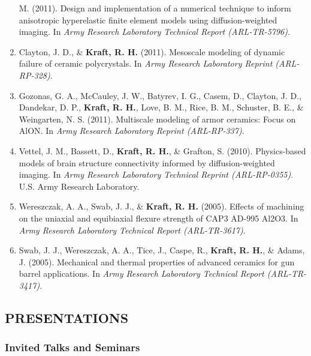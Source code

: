 \documentclass[11pt]{article}
\begin{document}
\begin{enumerate}
M. 
(2011). 
Design and implementation of a
  numerical technique to inform anisotropic hyperelastic finite element
  models using diffusion-weighted imaging. 
In \emph{Army Research
  Laboratory Technical Report (ARL-TR-5796)}.
\item
  Clayton, J. 
D., \& \textbf{\textbf{Kraft,} R. 
H.} (2011). 
Mesoscale modeling of dynamic
  failure of ceramic polycrystals. 
In \emph{Army Research Laboratory
  Reprint (ARL-RP-328)}.
\item
  Gozonas, G. 
A., McCauley, J. 
W., Batyrev, I. 
G., Casem, D., Clayton,
  J. 
D., Dandekar, D. 
P., \textbf{\textbf{Kraft,} R. 
H.}, Love, B. 
M., Rice, B. 
M.,
  Schuster, B. 
E., \& Weingarten, N. 
S. 
(2011). 
Multiscale modeling of
  armor ceramics: Focus on AlON. 
In \emph{Army Research Laboratory
  Reprint (ARL-RP-337)}.
\item
  Vettel, J. 
M., Bassett, D., \textbf{\textbf{Kraft,} R. 
H.}, \& Grafton, S. 
(2010).
  Physics-based models of brain structure connectivity informed by
  diffusion-weighted imaging. 
In \emph{Army Research Laboratory
  Technical Reprint (ARL-RP-0355)}. 
U.S. 
Army Research Laboratory.
\item
  Wereszczak, A. 
A., Swab, J. 
J., \& \textbf{\textbf{Kraft,} R. 
H.} (2005). 
Effects of
  machining on the uniaxial and equibiaxial flexure strength of CAP3
  AD-995 Al2O3. 
In \emph{Army Research Laboratory Technical Report
  (ARL-TR-3617)}.
\item
  Swab, J. 
J., Wereszczak, A. 
A., Tice, J., Caspe, R., \textbf{\textbf{Kraft,} R. 
H.}, \&
  Adams, J. 
(2005). 
Mechanical and thermal properties of advanced
  ceramics for gun barrel applications. 
In \emph{Army Research
  Laboratory Technical Report (ARL-TR-3417)}.
\end{enumerate}

\subsection{PRESENTATIONS}\label{presentations}

\subsubsection{Invited Talks and Seminars}\label{invited}
\end{document}
